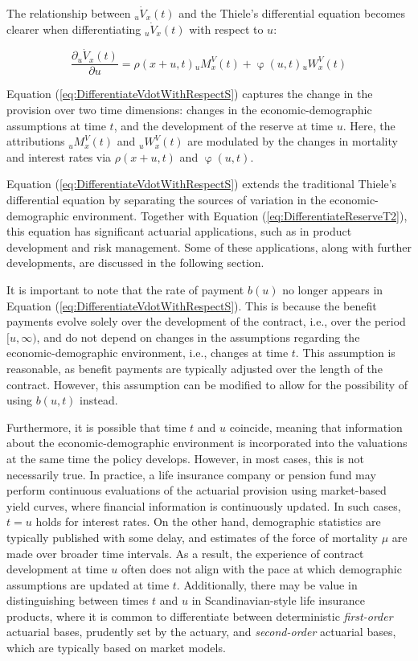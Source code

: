 \documentclass[12pt]{article}
\begin{document}
{ 
The relationship between ${}_u\dot{V}_x(t)$ and the Thiele's differential equation becomes clearer when differentiating ${}_u\dot{V}_x(t)$ with respect to $u$: 

\begin{equation}\label{eq:DifferentiateVdotWithRespectS}
\dfrac{\partial	{}_u\dot{V}_x(t)}{\partial u}= \rho(x+u,t) {}_uM^V_x(t)+ \upvarphi(u,t) {}_uW^V_x(t)
\end{equation}

Equation (\ref{eq:DifferentiateVdotWithRespectS}) captures the change in the provision over two time dimensions: changes in the economic-demographic assumptions at time \( t \), and the development of the reserve at time \( u \). Here, the attributions \( {}_uM^V_x(t) \) and \( {}_uW^V_x(t) \) are modulated by the changes in mortality and interest rates via \( \rho(x+u,t) \) and \( \upvarphi(u,t) \).

Equation (\ref{eq:DifferentiateVdotWithRespectS}) extends the traditional Thiele’s differential equation by separating the sources of variation in the economic-demographic environment. Together with Equation (\ref{eq:DifferentiateReserveT2}), this equation has significant actuarial applications, such as in product development and risk management. Some of these applications, along with further developments, are discussed in the following section.

It is important to note that the rate of payment \( b(u) \) no longer appears in Equation (\ref{eq:DifferentiateVdotWithRespectS}). This is because the benefit payments evolve solely over the development of the contract, i.e., over the period \( [u, \infty) \), and do not depend on changes in the assumptions regarding the economic-demographic environment, i.e., changes at time \( t \). This assumption is reasonable, as benefit payments are typically adjusted over the length of the contract. However, this assumption can be modified to allow for the possibility of using \( b(u,t) \) instead.

Furthermore, it is possible that time \( t \) and \( u \) coincide, meaning that information about the economic-demographic environment is incorporated into the valuations at the same time the policy develops. However, in most cases, this is not necessarily true. In practice, a life insurance company or pension fund may perform continuous evaluations of the actuarial provision using market-based yield curves, where financial information is continuously updated. In such cases, \( t = u \) holds for interest rates. On the other hand, demographic statistics are typically published with some delay, and estimates of the force of mortality \( \mu \) are made over broader time intervals. As a result, the experience of contract development at time \( u \) often does not align with the pace at which demographic assumptions are updated at time \( t \). Additionally, there may be value in distinguishing between times \( t \) and \( u \) in Scandinavian-style life insurance products, where it is common to differentiate between deterministic \textit{first-order} actuarial bases, prudently set by the actuary, and \textit{second-order} actuarial bases, which are typically based on market models.


}
\end{document}
